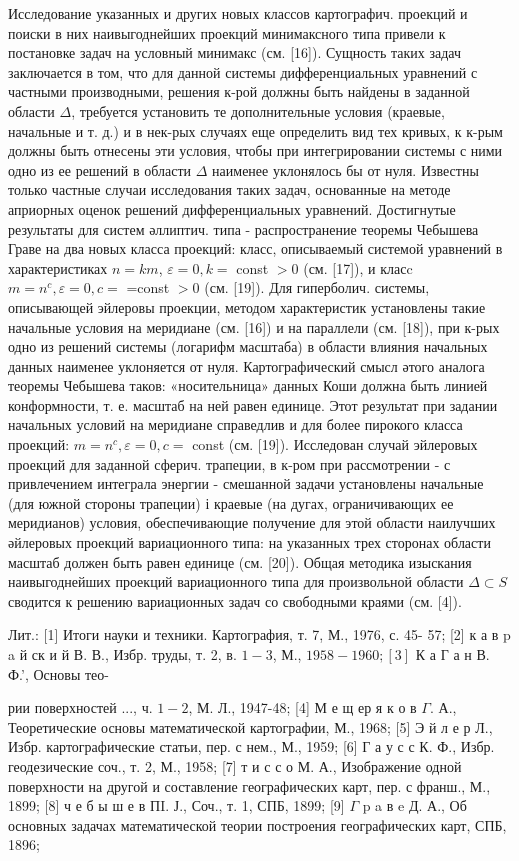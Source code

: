 \documentclass[10pt]{article}
\begin{document}
Исследование указанных и других новых классов картографич. проекций и поиски в них наивыгоднейших проекций минимаксного типа привели к постановке задач на условный минимакс (см. [16]). Сущность таких задач заключается в том, что для данной системы дифференциальных уравнений с частными производными, решения к-рой должны быть найдены в заданной области $\Delta$, требуется установить те дополнительные условия (краевые, начальные и т. д.) и в нек-рых случаях еще определить вид тех кривых, к к-рым должны быть отнесены эти условия, чтобы при интегрировании системы с ними одно из ее решений в области $\Delta$ наименее уклонялось бы от нуля. Известны только частные случаи исследования таких задач, основанные на методе априорных оценок решений дифференциальных уравнений. Достигнутые результаты для систем әллиптич. типа - распространение теоремы Чебышева Граве на два новых класса проекций: класс, описываемый системой уравнений в характеристиках $n=k m$, $\varepsilon=0, k=$ const $>0$ (см. [17]), и класc $m=n^{c}, \varepsilon=0, c=$ =const $>0$ (см. [19]). Для гиперболич. системы, описывающей эйлеровы проекции, методом характеристик установлены такие начальные условия на меридиане (см. [16]) и на параллели (см. [18]), при к-рых одно из решений системы (логарифм масштаба) в области влияния начальных данных наименее уклоняется от нуля. Картографический смысл әтого аналога теоремы Чебышева таков: «носительница» данных Коши должна быть линией конформности, т. е. масштаб на ней равен единице. Этот результат при задании начальных условий на меридиане справедлив и для более пирокого класса проекций: $m=n^{c}, \varepsilon=0, c=$ const (см. [19]). Исследован случай эйлеровых проекций для заданной сферич. трапеции, в к-ром при рассмотрении - с привлечением интеграла энергии - смешанной задачи установлены начальные (для южной стороны трапеции) і краевые (на дугах, ограничивающих ее меридианов) условия, обеспечивающие получение для этой области наилучших әйлеровых проекций вариационного типа: на указанных трех сторонах области масштаб должен быть равен единице (см. [20]). Общая методика изыскания наивыгоднейших проекций вариационного типа для произвольной области $\Delta \subset S$ сводится к решению вариационных задач со свободными краями (см. [4]).



Лит.: [1] Итоги науки и техники. Картография, т. 7, М., 1976, с. 45- 57; [2] к а в p a й ск и й В. В., Избр. труды, т. 2, в. $1-3$, М., $1958-1960 ;[3]$ К а Г а н В. Ф.', Основы тео-

рии поверхностей ..., ч. $1-2$, М. Л., 1947-48; [4] М е щ ер я к о в $\Gamma$. А., Теоретические основы математической картографии, М., 1968; [5] Э й л е р Л., Избр. картографические статьи, пер. с нем., М., 1959; [6] Г а у с с К. Ф., Избр. геодезические соч., т. 2, М., 1958; [7] т и с с о М. А., Изображение одной поверхности на другой и составление географических карт, пер. с франш., М., 1899; [8] ч е б ы ш е в ПI. Ј., Соч., т. 1, СПБ, 1899; [9] $\Gamma$ p a в e Д. А., Об основных задачах математической теории построения географических карт, СПБ, 1896;
\end{document}

